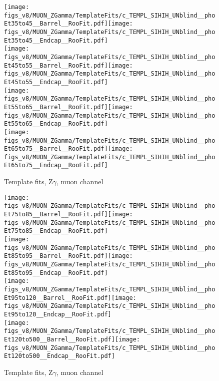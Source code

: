 \begin{figure}[htb]
  \begin{center}
   \texttt{[image: figs\_v8/MUON\_ZGamma/TemplateFits/c\_TEMPL\_SIHIH\_UNblind\_\_phoEt35to45\_\_Barrel\_\_RooFit.pdf]}\texttt{[image: figs\_v8/MUON\_ZGamma/TemplateFits/c\_TEMPL\_SIHIH\_UNblind\_\_phoEt35to45\_\_Endcap\_\_RooFit.pdf]}\\
   \texttt{[image: figs\_v8/MUON\_ZGamma/TemplateFits/c\_TEMPL\_SIHIH\_UNblind\_\_phoEt45to55\_\_Barrel\_\_RooFit.pdf]}\texttt{[image: figs\_v8/MUON\_ZGamma/TemplateFits/c\_TEMPL\_SIHIH\_UNblind\_\_phoEt45to55\_\_Endcap\_\_RooFit.pdf]}\\
   \texttt{[image: figs\_v8/MUON\_ZGamma/TemplateFits/c\_TEMPL\_SIHIH\_UNblind\_\_phoEt55to65\_\_Barrel\_\_RooFit.pdf]}\texttt{[image: figs\_v8/MUON\_ZGamma/TemplateFits/c\_TEMPL\_SIHIH\_UNblind\_\_phoEt55to65\_\_Endcap\_\_RooFit.pdf]}\\
   \texttt{[image: figs\_v8/MUON\_ZGamma/TemplateFits/c\_TEMPL\_SIHIH\_UNblind\_\_phoEt65to75\_\_Barrel\_\_RooFit.pdf]}\texttt{[image: figs\_v8/MUON\_ZGamma/TemplateFits/c\_TEMPL\_SIHIH\_UNblind\_\_phoEt65to75\_\_Endcap\_\_RooFit.pdf]}\\
  \label{fig:templateFits_SIHIH_MUON_ZGamma_2}
  \caption{Template fits, Z$\gamma$, muon channel}
  \end{center}
\end{figure}

\begin{figure}[htb]
  \begin{center}
   \texttt{[image: figs\_v8/MUON\_ZGamma/TemplateFits/c\_TEMPL\_SIHIH\_UNblind\_\_phoEt75to85\_\_Barrel\_\_RooFit.pdf]}\texttt{[image: figs\_v8/MUON\_ZGamma/TemplateFits/c\_TEMPL\_SIHIH\_UNblind\_\_phoEt75to85\_\_Endcap\_\_RooFit.pdf]}\\
   \texttt{[image: figs\_v8/MUON\_ZGamma/TemplateFits/c\_TEMPL\_SIHIH\_UNblind\_\_phoEt85to95\_\_Barrel\_\_RooFit.pdf]}\texttt{[image: figs\_v8/MUON\_ZGamma/TemplateFits/c\_TEMPL\_SIHIH\_UNblind\_\_phoEt85to95\_\_Endcap\_\_RooFit.pdf]}\\
   \texttt{[image: figs\_v8/MUON\_ZGamma/TemplateFits/c\_TEMPL\_SIHIH\_UNblind\_\_phoEt95to120\_\_Barrel\_\_RooFit.pdf]}\texttt{[image: figs\_v8/MUON\_ZGamma/TemplateFits/c\_TEMPL\_SIHIH\_UNblind\_\_phoEt95to120\_\_Endcap\_\_RooFit.pdf]}\\
   \texttt{[image: figs\_v8/MUON\_ZGamma/TemplateFits/c\_TEMPL\_SIHIH\_UNblind\_\_phoEt120to500\_\_Barrel\_\_RooFit.pdf]}\texttt{[image: figs\_v8/MUON\_ZGamma/TemplateFits/c\_TEMPL\_SIHIH\_UNblind\_\_phoEt120to500\_\_Endcap\_\_RooFit.pdf]}\\
  \label{fig:templateFits_SIHIH_MUON_ZGamma_3}
  \caption{Template fits, Z$\gamma$, muon channel}
  \end{center}
\end{figure}

